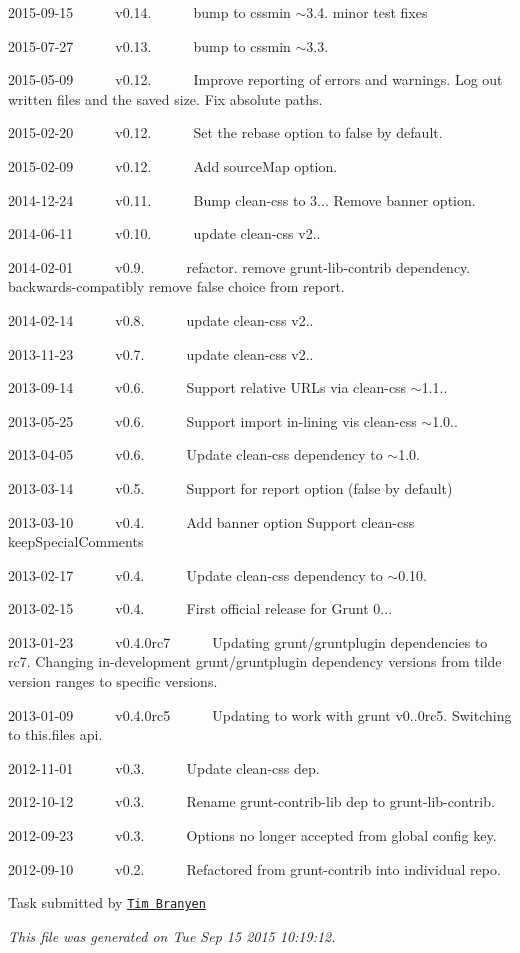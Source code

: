 \begin{DoxyItemize}
\item 2015-\/09-\/15   v0.14.   bump to cssmin $\sim$3.4. minor test fixes
\item 2015-\/07-\/27   v0.13.   bump to cssmin $\sim$3.3.
\item 2015-\/05-\/09   v0.12.   \+Improve reporting of errors and warnings. Log out written files and the saved size. Fix absolute paths.
\item 2015-\/02-\/20   v0.12.   \+Set the {\ttfamily rebase} option to {\ttfamily false} by default.
\item 2015-\/02-\/09   v0.12.   \+Add {\ttfamily source\+Map} option.
\item 2014-\/12-\/24   v0.11.   \+Bump {\ttfamily clean-\/css} to 3... Remove {\ttfamily banner} option.
\item 2014-\/06-\/11   v0.10.   update clean-\/css v2..
\item 2014-\/02-\/01   v0.9.   refactor. remove grunt-\/lib-\/contrib dependency. backwards-\/compatibly remove {\ttfamily false} choice from {\ttfamily report}.
\item 2014-\/02-\/14   v0.8.   update clean-\/css v2..
\item 2013-\/11-\/23   v0.7.   update clean-\/css v2..
\item 2013-\/09-\/14   v0.6.   \+Support relative U\+R\+Ls via clean-\/css $\sim$1.1..
\item 2013-\/05-\/25   v0.6.   \+Support import in-\/lining vis clean-\/css $\sim$1.0..
\item 2013-\/04-\/05   v0.6.   \+Update clean-\/css dependency to $\sim$1.0.
\item 2013-\/03-\/14   v0.5.   \+Support for \textquotesingle{}report\textquotesingle{} option (false by default)
\item 2013-\/03-\/10   v0.4.   \+Add banner option Support clean-\/css keep\+Special\+Comments
\item 2013-\/02-\/17   v0.4.   \+Update clean-\/css dependency to $\sim$0.10.
\item 2013-\/02-\/15   v0.4.   \+First official release for Grunt 0...
\item 2013-\/01-\/23   v0.4.\+0rc7   \+Updating grunt/gruntplugin dependencies to rc7. Changing in-\/development grunt/gruntplugin dependency versions from tilde version ranges to specific versions.
\item 2013-\/01-\/09   v0.4.\+0rc5   \+Updating to work with grunt v0..\+0rc5. Switching to this.\+files api.
\item 2012-\/11-\/01   v0.3.   \+Update clean-\/css dep.
\item 2012-\/10-\/12   v0.3.   \+Rename grunt-\/contrib-\/lib dep to grunt-\/lib-\/contrib.
\item 2012-\/09-\/23   v0.3.   \+Options no longer accepted from global config key.
\item 2012-\/09-\/10   v0.2.   \+Refactored from grunt-\/contrib into individual repo. 


\end{DoxyItemize}

Task submitted by \href{http://tbranyen.com/}{\tt Tim Branyen}

{\itshape This file was generated on Tue Sep 15 2015 10\+:19\+:12.} 